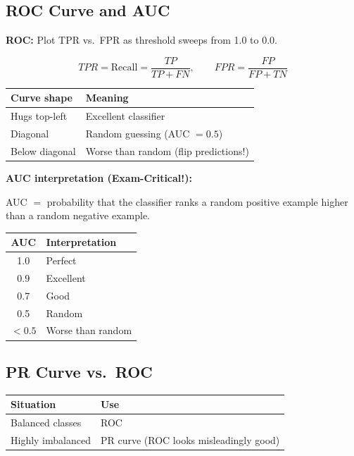 \documentclass[11pt,a4paper]{article}
\begin{document}
\subsection{ROC Curve and AUC}

\textbf{ROC:} Plot TPR vs.\ FPR as threshold sweeps from 1.0 to 0.0.

$$TPR = \text{Recall} = \frac{TP}{TP + FN}, \qquad FPR = \frac{FP}{FP + TN}$$

\begin{center}
\begin{tabular}{|l|l|}
\hline
\textbf{Curve shape} & \textbf{Meaning} \\
\hline
Hugs top-left & Excellent classifier \\
Diagonal & Random guessing (AUC $= 0.5$) \\
Below diagonal & Worse than random (flip predictions!) \\
\hline
\end{tabular}
\end{center}

\textbf{AUC interpretation (Exam-Critical!):}

\begin{tcolorbox}[colback=yellow!10,colframe=orange!50]
AUC $=$ probability that the classifier ranks a random positive example higher than a random negative example.
\end{tcolorbox}

\begin{center}
\begin{tabular}{|c|l|}
\hline
\textbf{AUC} & \textbf{Interpretation} \\
\hline
1.0 & Perfect \\
0.9 & Excellent \\
0.7 & Good \\
0.5 & Random \\
$< 0.5$ & Worse than random \\
\hline
\end{tabular}
\end{center}

\subsection{PR Curve vs.\ ROC}

\begin{center}
\begin{tabular}{|l|l|}
\hline
\textbf{Situation} & \textbf{Use} \\
\hline
Balanced classes & ROC \\
Highly imbalanced & PR curve (ROC looks misleadingly good) \\
\hline
\end{tabular}
\end{center}
\end{document}
